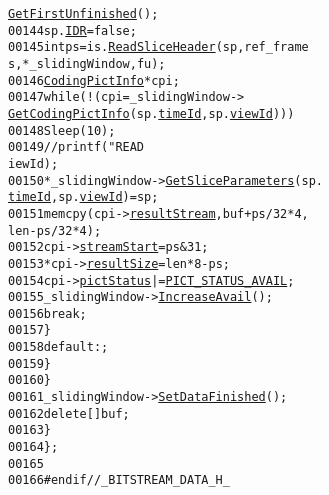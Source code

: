 \begin{footnotesize}
\begin{alltt}
      \hyperlink{class_sliding_window_a3be69abc76bff5b71ab96dadcced9f65}{GetFirstUnfinished}();
00144                                         sp.\hyperlink{struct_slice_parameters_a60f8fe21acd611ec6892e47a2c6029e3}{IDR} = \textcolor{keyword}{false};
00145                                         \textcolor{keywordtype}{int} ps = is.\hyperlink{class_in_stream_a6369ed63c0fad1007f16e3e885825aea}{ReadSliceHeader}(sp, ref\_frame
      s, *\_slidingWindow, fu);
00146                                         \hyperlink{struct_coding_pict_info}{CodingPictInfo} *cpi;
00147                                         \textcolor{keywordflow}{while} (!(cpi = \_slidingWindow->
      \hyperlink{class_sliding_window_ac50874323a2aaa4ef76fab47f80c9f92}{GetCodingPictInfo}(sp.\hyperlink{struct_slice_parameters_ad6a26fe2f228235e4f0c31c336cf5e12}{timeId}, sp.\hyperlink{struct_slice_parameters_ae570f1ba10b1e091c7519264534a7143}{viewId})))
00148                                                 Sleep(10);
00149                                         \textcolor{comment}{//printf("READ %d, %d\(\backslash\)n", sp.timeId, sp.v
      iewId);}
00150                                         *\_slidingWindow->\hyperlink{class_sliding_window_a020d2c25f1bda31337f91bf9b1a809d1}{GetSliceParameters}(sp.
      \hyperlink{struct_slice_parameters_ad6a26fe2f228235e4f0c31c336cf5e12}{timeId}, sp.\hyperlink{struct_slice_parameters_ae570f1ba10b1e091c7519264534a7143}{viewId}) = sp;
00151                                         memcpy(cpi->\hyperlink{struct_coding_pict_info_af53de7a35b8796df845ddee01d70fc5b}{resultStream}, buf + ps/32*4, 
      len-ps/32*4);
00152                                         cpi->\hyperlink{struct_coding_pict_info_a589da1ebbfa6493b63005412ce79dac6}{streamStart} = ps & 31;
00153                                         *cpi->\hyperlink{struct_coding_pict_info_a37155b7c53db0a4a94d314bdc3c95104}{resultSize} = len * 8 - ps;
00154                                         cpi->\hyperlink{struct_coding_pict_info_a41498e5ba764405481005e6569d7f728}{pictStatus} |= \hyperlink{_picture_info_8h_aecbf7bf3158e75ca4906202b17b8f9ef}{PICT_STATUS_AVAIL};
00155                                         \_slidingWindow->\hyperlink{class_sliding_window_a7bce9e53d3618b89f47684ec1432848d}{IncreaseAvail}();
00156                                         \textcolor{keywordflow}{break};
00157                                 \}
00158                         \textcolor{keywordflow}{default} : ;
00159                         \}
00160                 \}
00161                 \_slidingWindow->\hyperlink{class_sliding_window_ac2fd5605777fc2f4fdff84282a8467f8}{SetDataFinished}();
00162                 \textcolor{keyword}{delete}[] buf;
00163         \}
00164 \};
00165 
00166 \textcolor{preprocessor}{#endif //\_BITSTREAM\_DATA\_H\_}
\end{alltt}\end{footnotesize}

